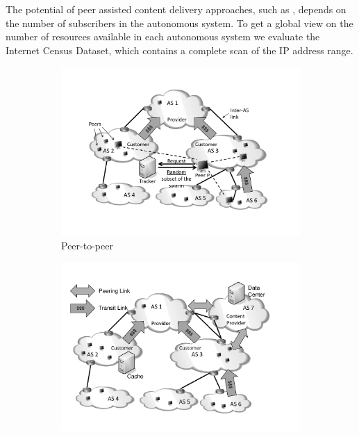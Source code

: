The potential of peer assisted content delivery approaches, such as \cite{HORST}, depends on the number of subscribers in the autonomous system.
To get a global view on the number of resources available in each autonomous system we evaluate the Internet Census Dataset, which contains a complete scan of the IP address range.

\begin{figure}[bt]
	\centering
\vspace{-0.2cm}
\hspace{-0.5cm}
	\begin{subfigure}[b]{0.54\textwidth}
	  \includegraphics[width=\textwidth]{aslevel/figs/p2p}
    \vspace{-0.5cm}
    \caption{Peer-to-peer}
    \label{fig:aslevel:cdn}
  \end{subfigure}
\hspace{-0.5cm}
	\begin{subfigure}[b]{0.54\textwidth}
	 	\includegraphics[width=\textwidth]{aslevel/figs/cdn}

\end{subfigure}
\end{figure}
